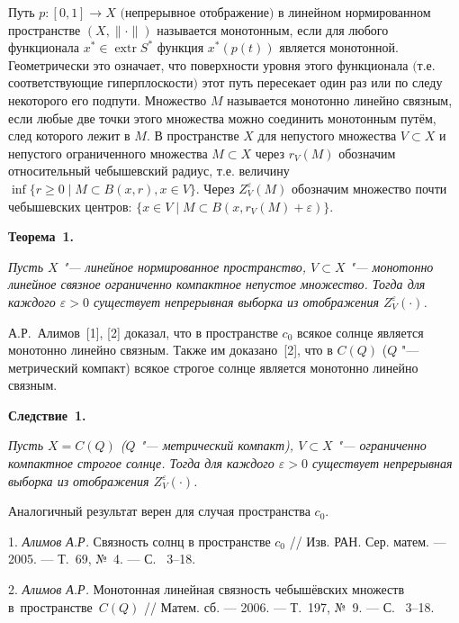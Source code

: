 \vzmscaption


Путь $p:[0,1]\rightarrow X$ $($непрерывное
отображение$)$ в линейном нормированном пространстве
$(X,\|\cdot\|)$ называется монотонным, если для любого функционала
$x^*\in\operatorname{extr}S^*$ функция $x^*(p(t))$ является
монотонной. Геометрически это означает, что поверхности уровня этого функционала $($т.е.
соответствующие гиперплоскости$)$ этот путь пересекает один раз или
по следу некоторого его подпути.
Множество $M$ называется монотонно линейно связным, если любые
две точки этого множества можно соединить монотонным путём, след
которого лежит в $M.$
В пространстве $X$ для непустого множества $V\subset X$ и непустого ограниченного множества $M\subset X$ через $r_V(M)$ обозначим относительный чебышевский радиус, т.е. величину $\inf\{r\geqslant 0\mid M\subset B(x,r), x\in V\}$. Через
 $Z_V^\varepsilon (M)$ обозначим множество почти чебышевских центров: $ \{x\in V\mid M\subset B(x,r_V(M)+\varepsilon)\}$.


\textbf{Теорема~1.} {\it Пусть $X$ "--- линейное нормированное пространство, $V\subset X$ "--- монотонно линейное связное ограниченно компактное непустое множество. Тогда для каждого $\varepsilon>0$ существует непрерывная выборка из отображения $Z_V^\varepsilon(\cdot)$.


}


А.Р.~Алимов~[1], [2] доказал, что в пространстве $c_0$ всякое солнце является монотонно линейно связным. Также им доказано~[2], что в $C(Q)$ ($Q$ "--- метрический компакт) всякое строгое солнце является монотонно линейно связным.




\textbf{Следствие~1.} {\it Пусть $X=C(Q) $ ($Q$ "--- метрический компакт), $V\subset X$ "--- ограниченно компактное строгое солнце. Тогда для каждого $\varepsilon>0$ существует непрерывная выборка из отображения $Z_V^\varepsilon(\cdot)$.

}

Аналогичный результат верен для случая пространства $c_0$.

\litlist


1. {\it Алимов А.Р.} Связность солнц в пространстве $c_0$ // Изв. РАН. Сер. матем.
--- 2005. ---
Т.~69,
№~4. --- С.~ 3--18.

2. {\it Алимов А.Р.} Монотонная линейная связность
чебышёвских множеств в~пространстве~$C(Q)$ // Матем. сб.
--- 2006. ---
Т.~197,
№~9. --- С.~ 3--18.
